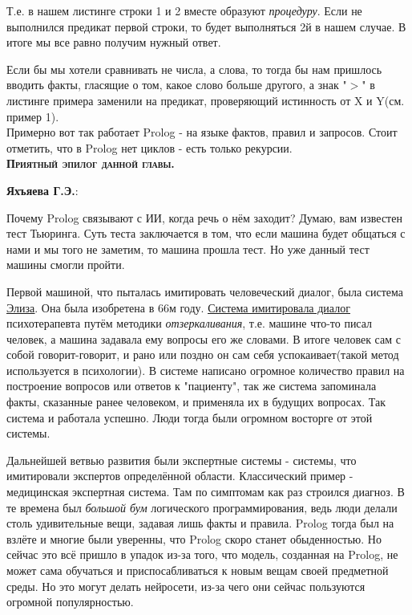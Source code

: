 \documentclass[18pt, a4paper]{extarticle}
\newcommand{\bftex}[1]{\textbf{\textsc{#1}.}}
\begin{document}
Т.е. в нашем листинге строки 1 и 2 вместе образуют \textit{процедуру}. Если не выполнился предикат первой строки, то будет выполняться 2й в нашем случае. В итоге мы все равно получим нужный ответ.

Если бы мы хотели сравнивать не числа, а слова, то тогда бы нам пришлось вводить факты, гласящие о том, какое слово больше другого, а знак "$>$"{} в листинге примера заменили на предикат, проверяющий истинность от X и Y(см. пример 1).\\

Примерно вот так работает Prolog - на языке фактов, правил и запросов. Стоит отметить, что в Prolog нет циклов - есть только рекурсии.\\

\bftex{Приятный эпилог данной главы}

\textbf{Яхъяева Г.Э.}:

Почему Prolog связывают с ИИ, когда речь о нём заходит? Думаю, вам известен тест Тьюринга. Суть теста заключается в том, что если машина будет общаться с нами и мы того не заметим, то машина прошла тест. Но уже данный тест машины смогли пройти. 

Первой машиной, что пыталась имитировать человеческий диалог, была система \href{https://ru.wikipedia.org/wiki/\%D0\%AD\%D0\%BB\%D0\%B8\%D0\%B7\%D0\%B0_(\%D0\%BF\%D1\%80\%D0\%BE\%D0\%B3\%D1\%80\%D0\%B0\%D0\%BC\%D0\%BC\%D0\%B0)}{\underline{Элиза}}. Она была изобретена в 66м году. \href{http://www.manifestation.com/neurotoys/eliza.php3}{\underline{Система имитировала диалог}} психотерапевта путём методики \textit{отзеркаливания}, т.е. машине что-то писал человек, а машина задавала ему вопросы его же словами. В итоге человек сам с собой говорит-говорит, и рано или поздно он сам себя успокаивает(такой метод используется в психологии). В системе написано огромное количество правил на построение вопросов или ответов к "пациенту"{}, так же система запоминала факты, сказанные ранее человеком, и применяла их в будущих вопросах. Так система и работала успешно. Люди тогда были огромном восторге от этой системы. 

Дальнейшей ветвью развития были экспертные системы - системы, что имитировали экспертов определённой области. Классический пример - медицинская экспертная система. Там по симптомам как раз строился диагноз. В те времена был \textit{большой бум} логического программирования, ведь люди делали столь удивительные вещи, задавая лишь факты и правила. Prolog тогда был на взлёте и многие были уверенны, что Prolog скоро станет обыденностью. Но сейчас это всё пришло в упадок из-за того, что модель, созданная на Prolog, не может сама обучаться и приспосабливаться к новым вещам своей предметной среды. Но это могут делать нейросети, из-за чего они сейчас пользуются огромной популярностью.
\end{document}

